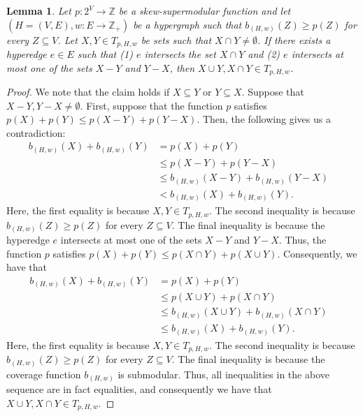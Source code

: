 \documentclass{article}
\newtheorem{lemma}{Lemma}[section]
\newcommand{\tightSetFamily}[1]{\ensuremath{T_{#1}}\xspace}
\providecommand{\Z}{\mathbb{Z}}
\begin{document}
\begin{lemma}\label{lem:weak-to-strong:uncrossing:uncrossing-lemma}
Let $p:2^V\rightarrow\Z$ be a skew-supermodular function and let $\left(H = (V, E), w:E \rightarrow\Z_+\right)$ be a hypergraph such that $b_{(H,w)}(Z) \geq p(Z)$ for every $Z \subseteq V$. Let $X, Y \in \tightSetFamily{p, H, w}$ be sets such that $X\cap Y \not = \emptyset$.
If there exists a hyperedge $e \in E$ such that (1) $e$ intersects the set $X\cap Y$ and 
(2) $e$ intersects at most one of the sets $X - Y$ and $Y - X$, then $X\cup Y, X \cap Y \in \tightSetFamily{p, H, w}$.
\end{lemma}
\begin{proof}
We note that the claim holds if $X\subseteq Y$ or $Y \subseteq X$. Suppose that $X - Y, Y - X \not= \emptyset$. First, suppose that the function $p$ satisfies $p(X) + p(Y) \leq p(X - Y) + p(Y - X)$. Then, the following gives us a contradiction:
\begin{align*}
    b_{(H,w)}(X) + b_{(H,w)}(Y) 
    &= p(X) + p(Y) &\\
    & \leq p(X - Y) + p(Y - X) & \\
    & \leq b_{(H,w)}(X - Y) + b_{(H,w)}(Y - X) & \\
    & < b_{(H,w)}(X) + b_{(H,w)}(Y).
\end{align*}
Here, the first equality is because $X, Y \in \tightSetFamily{p, H, w}$. The second inequality is because $b_{(H,w)}(Z) \geq p(Z)$ for every $Z\subseteq V$. The final inequality is because the hyperedge $e$ intersects at most one of the sets $X - Y$ and $Y - X$.
Thus, the function $p$ satisfies $p(X) + p(Y) \leq p(X\cap Y) + p(X \cup Y)$. Consequently, we have that
\begin{align*}
    b_{(H,w)}(X) + b_{(H,w)}(Y) 
    &= p(X) + p(Y) &\\
    & \leq p(X \cup Y) + p(X \cap Y) &\\
    & \leq b_{(H,w)}(X\cup Y) + b_{(H,w)}(X\cap Y) &\\
    & \leq b_{(H,w)}(X) + b_{(H,w)}(Y).&
\end{align*}
Here, the first equality is because $X, Y \in \tightSetFamily{p, H, w}$. The second inequality is because $b_{(H,w)}(Z) \geq p(Z)$ for every $Z\subseteq V$. The final inequality is because the coverage function $b_{(H, w)}$ is submodular. Thus, all inequalities in the above sequence are in fact equalities, and consequently we have that $X\cup Y, X\cap Y \in \tightSetFamily{p, H, w}$.
\end{proof}
\end{document}
